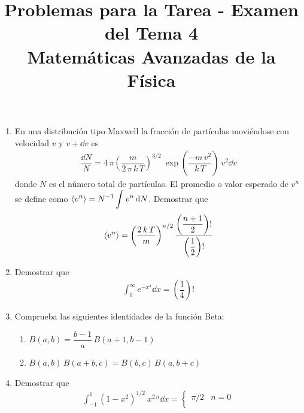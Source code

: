 
\title{Problemas para la Tarea - Examen del Tema 4 \\ \large{Matemáticas Avanzadas de la Física} \vspace{-1.5\baselineskip}}
\date{ }

\vspace{-4cm}
\renewcommand\labelenumii{\theenumi.{\arabic{enumii})}}
\maketitle
\fontsize{14}{14}\selectfont
\begin{enumerate}
\item En una distribución tipo Maxwell la fracción de partículas moviéndose con velocidad $v$ y $v +\dd{v}$ es
\begin{align*}
\dfrac{\dd{N}}{N} = 4 \, \pi \left( \dfrac{m}{2 \, \pi \, k \, T} \right)^{3/2} \: \exp \left( \dfrac{-m \, v^{2}}{k \, T} \right) \: v^{2} \dd{v}
\end{align*}
donde $N$ es el número total de partículas. El promedio o valor esperado de $v^{n}$ se define como $\displaystyle \expval{v^{n}} = N^{-1} \int v^{n} \dd{N}$. Demostrar que
\begin{align*}
\expval{v^{n}} = \left( \dfrac{2 \, k \, T}{m} \right)^{n/2} \dfrac{\left( \dfrac{n + 1}{2} \right) !} { \left( \dfrac{1}{2} \right) !}
\end{align*}
\item Demostrar que
\begin{align*}
\int_{0}^{\infty} e^{-x^{4}} \dd{x} = \left( \dfrac{1}{4} \right) !
\end{align*}
\item Comprueba las siguientes identidades de la función Beta:
\begin{enumerate}
\setlength{\itemsep}{15pt}
\item $B(a, b) = \dfrac{b - 1}{a} \, B (a + 1, b - 1)$
\item $B(a, b) \, B(a + b, c) = B(b, c) \, B(a, b + c)$
\end{enumerate}
\item Demostrar que
\begin{align*}
\int_{-1}^{1} (1-x^{2})^{1/2} \: x^{2 \, n} \dd{x} =  
\begin{cases}
\pi/2 & n = 0 \\[1em]

\end{cases}
\end{align*}
\end{enumerate}
